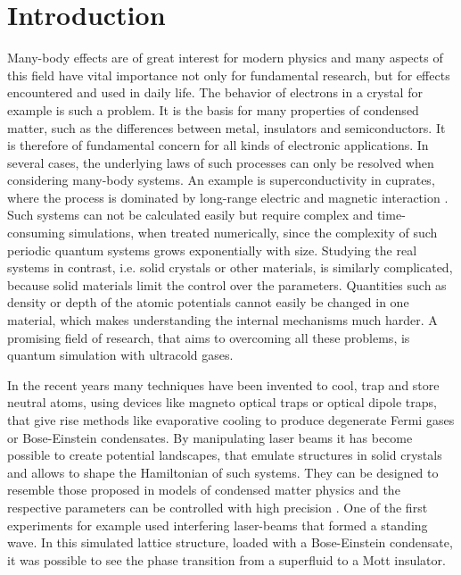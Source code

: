 \chapter{Introduction}

Many-body effects are of great interest for modern physics and many aspects of this field have vital importance not only for fundamental research, but for effects encountered and used in daily life. The behavior of electrons in a crystal for example is such a problem. It is the basis for many properties of condensed matter, such as the differences between metal, insulators and semiconductors. It is therefore of fundamental concern for all kinds of electronic applications. In several cases, the underlying laws of such processes can only be resolved when considering many-body systems. An example is superconductivity in cuprates, where the process is dominated by long-range electric and magnetic interaction \cite{cuprates}. Such systems can not be calculated easily but require complex and time-consuming simulations, when treated numerically, since the complexity of such periodic quantum systems grows exponentially with size\cite{feynman}. Studying the real systems in contrast, i.e. solid crystals or other materials, is similarly complicated, because solid materials limit the control over the parameters. Quantities such as density or depth of the atomic potentials cannot easily be changed in one material, which makes understanding the internal mechanisms much harder. A promising field of research, that aims to overcoming all these problems, is quantum simulation with ultracold gases. 

In the recent years many techniques have been invented to cool, trap and store neutral atoms, using devices like magneto optical traps or optical dipole traps\cite{metcalf}, that give rise methods like evaporative cooling to produce degenerate Fermi gases or Bose-Einstein condensates. By manipulating laser beams it has become possible to create potential landscapes, that emulate structures in solid crystals and allows to shape the Hamiltonian of such systems. They can be designed to resemble those proposed in models of condensed matter physics and the respective parameters can be controlled with high precision \cite{bloch}. One of the first experiments for example used interfering laser-beams that formed a standing wave. In this simulated lattice structure, loaded with a Bose-Einstein condensate, it was possible to see the phase transition from a superfluid to a Mott insulator\cite{greiner}.

